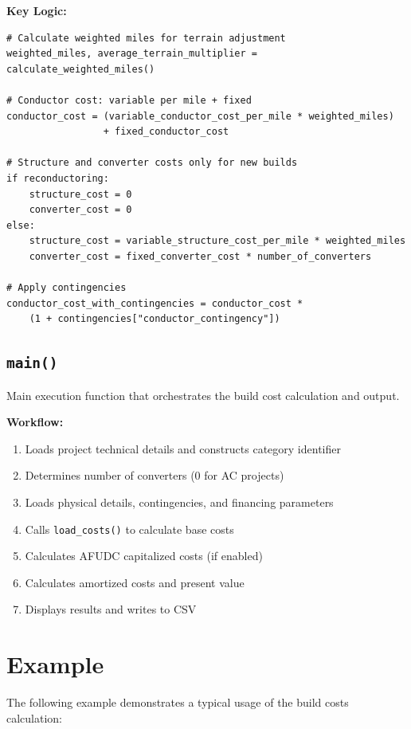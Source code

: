 \documentclass[12pt]{article}
\begin{document}
\textbf{Key Logic:}
\begin{lstlisting}
# Calculate weighted miles for terrain adjustment
weighted_miles, average_terrain_multiplier = calculate_weighted_miles()

# Conductor cost: variable per mile + fixed
conductor_cost = (variable_conductor_cost_per_mile * weighted_miles) 
                 + fixed_conductor_cost

# Structure and converter costs only for new builds
if reconductoring:
    structure_cost = 0
    converter_cost = 0
else:
    structure_cost = variable_structure_cost_per_mile * weighted_miles
    converter_cost = fixed_converter_cost * number_of_converters

# Apply contingencies
conductor_cost_with_contingencies = conductor_cost * 
    (1 + contingencies["conductor_contingency"])
\end{lstlisting}

\subsection{\texttt{main()}}

Main execution function that orchestrates the build cost calculation and output.

\textbf{Workflow:}
\begin{enumerate}
    \item Loads project technical details and constructs category identifier
    \item Determines number of converters (0 for AC projects)
    \item Loads physical details, contingencies, and financing parameters
    \item Calls \texttt{load\_costs()} to calculate base costs
    \item Calculates AFUDC capitalized costs (if enabled)
    \item Calculates amortized costs and present value
    \item Displays results and writes to CSV
\end{enumerate}

\section{Example}

The following example demonstrates a typical usage of the build costs calculation:
\end{document}
